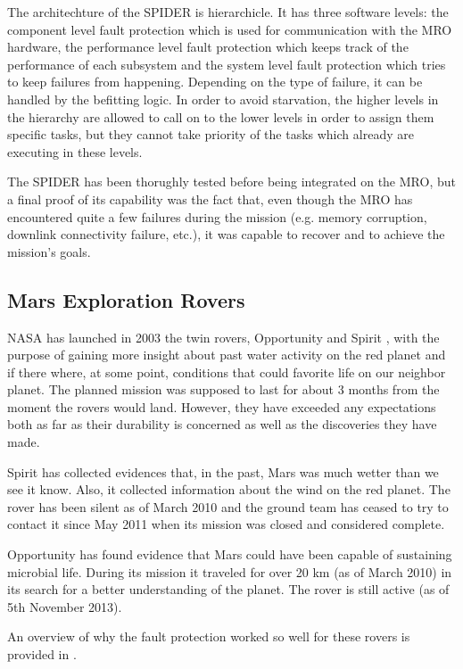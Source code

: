 The architechture of the SPIDER is hierarchicle. It has three software levels:
the component level fault protection which is used for communication with the
MRO hardware, the performance level fault protection which keeps track of the
performance of each subsystem and the system level fault protection which tries
to keep failures from happening. Depending on the type of failure, it can be
handled by the befitting logic. In order to avoid starvation, the higher levels
in the hierarchy are allowed to call on to the lower levels in order to assign
them specific tasks, but they cannot take priority of the tasks which
already are executing in these levels.

The SPIDER has been thorughly tested before being integrated on the MRO, but a
final proof of its capability was the fact that, even though the MRO has
encountered quite a few failures during the mission (e.g. memory corruption,
downlink connectivity failure, etc.), it was capable to recover and to achieve
the mission's goals.

\subsection{Mars Exploration Rovers}

NASA has launched in 2003 the twin rovers, Opportunity and Spirit
\cite{mer-nasa}, with the purpose of gaining more insight about past water
activity on the red planet and if there where, at some point, conditions that
could favorite life on our neighbor planet. The planned mission was supposed to
last for about 3 months from the moment the rovers would land. However, they
have exceeded any expectations both as far as their durability is concerned as
well as the discoveries they have made.

Spirit has collected evidences that, in the past, Mars was much wetter than we
see it know. Also, it collected information about the wind on the red planet.
The rover has been silent as of March 2010 and the ground team has ceased to try
to contact it since May 2011 when its mission was closed and considered
complete.

Opportunity has found evidence that Mars could have been capable of sustaining
microbial life. During its mission it traveled for over 20 km (as of March 2010)
in its search for a better understanding of the planet. The rover is still
active (as of 5th November 2013).

An overview of why the fault protection worked so well for these rovers is
provided in \cite{surv-nasa-mars}.

